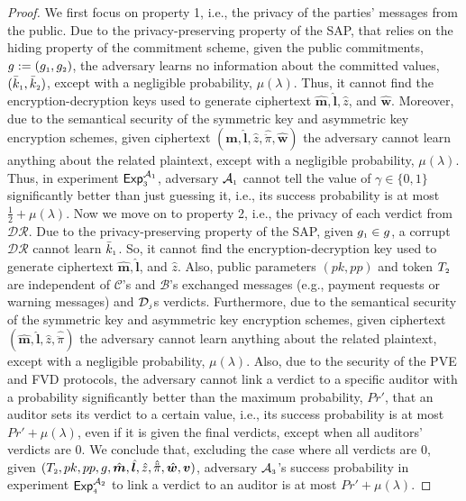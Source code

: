 % 

\begin{proof}
We first focus on property 1, i.e., the privacy of the parties' messages from the public.  Due to the privacy-preserving property of the SAP, that relies  on the hiding property of the commitment scheme, given the public commitments, $g:=(g_{\scriptscriptstyle 1}, g_{\scriptscriptstyle 2})$,  the adversary learns no information about the
committed values, $(\bar k_{\scriptscriptstyle 1}, \bar k_{\scriptscriptstyle 2})$, except with a negligible probability, $\mu(\lambda)$. Thus, it cannot find the encryption-decryption keys used to generate ciphertext  $\hat {\bm m}, \hat{\bm l}, \hat z$, and  $\hat{\bm{w}}$. Moreover, due to the semantical security of the symmetric key and asymmetric key encryption schemes,  given ciphertext $(\hat {\bm m}, \hat{\bm l}, \hat z, \hat{\ddot \pi}, \hat{\bm{w}})$ the adversary cannot learn anything  about the related plaintext, except with a negligible probability, $\mu(\lambda)$. Thus, in experiment  $\mathsf{Exp}_{\scriptscriptstyle 3}^{\mathcal{A}_{\scriptscriptstyle 1}}$,  adversary $\mathcal{A}_{\scriptscriptstyle 1}$ cannot tell the value of $\gamma\in \{0, 1\}$ significantly better than just guessing it, i.e., its success probability is at most $\frac{1}{2}+\mu(\lambda)$. Now we move on to property 2, i.e., the privacy of each verdict from $\mathcal{DR}$. Due to the privacy-preserving property of the SAP, given $g_{\scriptscriptstyle 1}\in g$, a corrupt $\mathcal{DR}$ cannot learn  $\bar k_{\scriptscriptstyle 1}$. So,  it cannot find the encryption-decryption key used to generate ciphertext  $\hat {\bm m}, \hat{\bm l}$, and $\hat z$. Also, public parameters $(pk,pp)$ and token $T_{\scriptscriptstyle 2}$ are independent of $\mathcal{C}$'s and $\mathcal{B}$'s exchanged messages (e.g., payment requests or warning messages)  and $\mathcal{D}_{\scriptscriptstyle j}$s  verdicts. Furthermore, due to  the semantical security of the symmetric key and asymmetric key encryption schemes,  given ciphertext $(\hat {\bm m}, \hat{\bm l}, \hat z, \hat{\ddot \pi})$ the adversary cannot learn anything  about the related plaintext, except with a negligible probability, $\mu(\lambda)$. Also, due to the security of the  PVE and FVD protocols, the adversary cannot link a verdict to a specific auditor with a probability significantly better than the maximum probability, $Pr'$, that an auditor sets its verdict to a certain value, i.e., its success probability is at most $Pr'+\mu(\lambda)$, even if it is given the final verdicts, except when all auditors' verdicts are $0$. We conclude that, excluding the case where  all verdicts are $0$, given $(T_{\scriptscriptstyle 2}, pk, pp, g, \hat{\bm m}, \hat{\bm l},  \hat z, \hat{\ddot \pi}, \hat{\bm{w}}, \bm v)$,   adversary $\mathcal{A}_{\scriptscriptstyle 3}$'s success probability in experiment $\mathsf{Exp}_{\scriptscriptstyle 4}^{\mathcal{A}_{\scriptscriptstyle 2}}$ to link a verdict to an auditor is at most $Pr'+\mu(\lambda)$. 
%
\end{proof}

